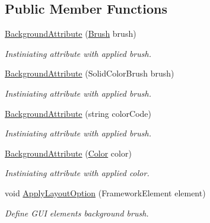 \subsection*{Public Member Functions}
\begin{DoxyCompactItemize}
\item 
\mbox{\hyperlink{class_wpf_handler_1_1_u_i_1_1_auto_layout_1_1_options_1_1_background_attribute_ade7defa6df0ce136497f5f8d617d645e}{Background\+Attribute}} (\mbox{\hyperlink{class_wpf_handler_1_1_u_i_1_1_color_attribute_afa14c4542d8023b3ddad6aba74993877}{Brush}} brush)
\begin{DoxyCompactList}\small\item\em Instiniating attribute with applied brush. \end{DoxyCompactList}\item 
\mbox{\hyperlink{class_wpf_handler_1_1_u_i_1_1_auto_layout_1_1_options_1_1_background_attribute_a5f31da6c168c956689ae1ef689bc2935}{Background\+Attribute}} (Solid\+Color\+Brush brush)
\begin{DoxyCompactList}\small\item\em Instiniating attribute with applied brush. \end{DoxyCompactList}\item 
\mbox{\hyperlink{class_wpf_handler_1_1_u_i_1_1_auto_layout_1_1_options_1_1_background_attribute_a47ce104c6fcb0fad6036dc109d1492eb}{Background\+Attribute}} (string color\+Code)
\begin{DoxyCompactList}\small\item\em Instiniating attribute with applied brush. \end{DoxyCompactList}\item 
\mbox{\hyperlink{class_wpf_handler_1_1_u_i_1_1_auto_layout_1_1_options_1_1_background_attribute_a2453a8f7be0ebe63191e01e6490052f8}{Background\+Attribute}} (\mbox{\hyperlink{class_wpf_handler_1_1_u_i_1_1_color_attribute_a6c5c2202427bd48877142ecf85327843}{Color}} color)
\begin{DoxyCompactList}\small\item\em Instiniating attribute with applied color. \end{DoxyCompactList}\item 
void \mbox{\hyperlink{class_wpf_handler_1_1_u_i_1_1_auto_layout_1_1_options_1_1_background_attribute_a97cce29c9e19d9145e881c69e3bf3d4e}{Apply\+Layout\+Option}} (Framework\+Element element)
\begin{DoxyCompactList}\small\item\em Define G\+UI element\textquotesingle{}s background brush. \end{DoxyCompactList}\end{DoxyCompactItemize}
